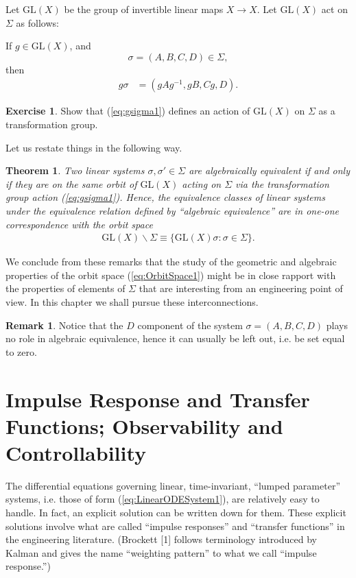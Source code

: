 \documentclass[12pt]{book}
\theoremstyle{plain}
\newtheorem{theorem}{Theorem}[section]
\theoremstyle{definition}
\newtheorem{exercise}{Exercise}[section]
\newtheorem*{remark}{Remark}
\begin{document}
Let $\mathrm{GL}(X)$ be the group of invertible linear maps $X \to X$.
Let $\mathrm{GL}(X)$ act on $\Sigma$ as follows:

If $g \in \mathrm{GL}(X)$, and
$$\sigma = (A, B, C, D) \in \Sigma,$$
then
\begin{align} \label{eq:gsigma1}
    g\sigma &= (gAg^{-1}, gB, Cg, D).
\end{align}

\begin{exercise}
    Show that (\ref{eq:gsigma1}) defines an action of $\mathrm{GL}(X)$ on $\Sigma$ as a transformation group.
\end{exercise}

Let us restate things in the following way.

\begin{theorem}
    Two linear systems $\sigma, \sigma' \in \Sigma$ are algebraically equivalent if and only if they are on the same orbit of $\mathrm{GL}(X)$ acting on $\Sigma$ via the transformation group action (\ref{eq:gsigma1}).
    Hence, the equivalence classes of linear systems under the equivalence relation defined by ``algebraic equivalence'' are in one-one correspondence with the orbit space
    \begin{align} \label{eq:OrbitSpace1}
        \mathrm{GL}(X)\backslash\Sigma \equiv \{\mathrm{GL}(X)\sigma : \sigma \in \Sigma\}.
    \end{align}
\end{theorem}

We conclude from these remarks that the study of the geometric and algebraic properties of the orbit space (\ref{eq:OrbitSpace1}) might be in close rapport with the properties of elements of $\Sigma$ that are interesting from an engineering point of view.
In this chapter we shall pursue these interconnections.

\begin{remark}
    Notice that the $D$ component of the system $\sigma = (A, B, C, D)$ plays no role in algebraic equivalence, hence it can usually be left out, i.e. be set equal to zero.
\end{remark}

\section{Impulse Response and Transfer Functions; Observability and Controllability}

The differential equations governing linear, time-invariant, ``lumped parameter'' systems, i.e. those of form (\ref{eq:LinearODESystem1}), are relatively easy to handle.
In fact, an explicit solution can be written down for them.
These explicit solutions involve what are called ``impulse responses'' and ``transfer functions'' in the engineering literature.
(Brockett [1] follows terminology introduced by Kalman and gives the name ``weighting pattern'' to what we call ``impulse response.'') %
\end{document}
